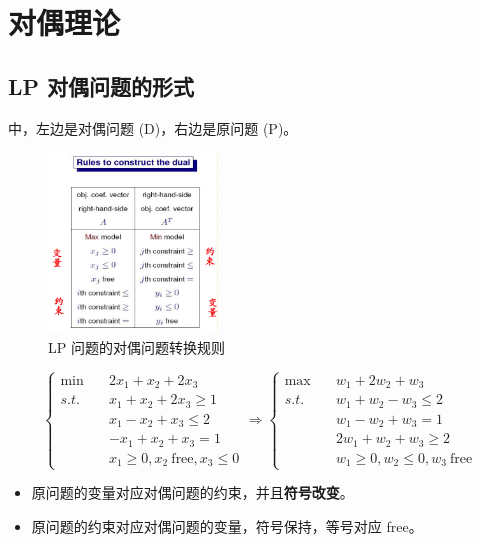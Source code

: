 \section{对偶理论}
\subsection{LP 对偶问题的形式}
\begin{note}
    中，左边是对偶问题 (D)，右边是原问题 (P)。
    \begin{figure}[htbp]
        \centering
        \includegraphics[width=0.4\textwidth]{./figures/img2.png}
        \caption{LP 问题的对偶问题转换规则 \label{fig2}}
    \end{figure}
    \[\begin{cases}
        \min \quad & 2x_1 + x_2 + 2x_3\\
        s.t. \quad & x_1 + x_2 + 2x_3 \ge 1\\
        &x_1 - x_2 + x_3 \le 2\\
        &-x_1 + x_2 + x_3 = 1\\
        &x_1 \ge 0, x_2 \ \text{free}, x_3 \le 0
    \end{cases} \Longrightarrow \begin{cases}
        \max \quad & w_1 + 2w_2 + w_3\\
        s.t. \quad & w_1 + w_2 - w_3 \le 2\\
        &w_1 - w_2 + w_3 = 1\\
        &2w_1 + w_2 + w_3 \ge 2\\
        &w_1 \ge 0, w_2 \le 0, w_3 \ \text{free}
    \end{cases}\]
    \begin{itemize}
        \item 原问题的变量对应对偶问题的约束，并且\textbf{符号改变}。
        \item 原问题的约束对应对偶问题的变量，符号保持，等号对应 free。
    \end{itemize}
\end{note}

